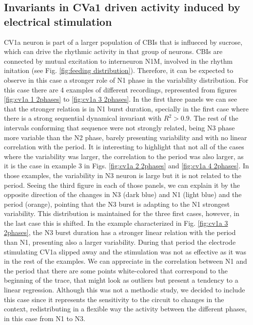 \subsection{Invariants in CVa1 driven activity induced by electrical stimulation}
CV1a neuron is part of a larger population of CBIs that is influeced by sucrose, which can drive the rhythmic activity in that group of neurons. CBIs are connected by mutual excitation to interneuron N1M, involved in the rhythm initation (see Fig. \ref{fig:feeding distribution}). Therefore, it can be expected to observe in this case a stronger role of N1 phase in the variability distribution. For this case there are 4 examples of different recordings, represented from figures \ref{fig:cv1a 1 2phases} to \ref{fig:cv1a 3 2phases}. In the first three panels we can see that the stronger relation is in N1 burst duration, specially in the first case where there is a strong sequential dynamical invariant with $R^2>0.9$. The rest of the intervals conforming that sequence were not strongly related, being N3 phase more variable than the N2 phase, barely presenting variability and with no linear correlation with the period. It is interesting to highlight that not all of the cases where the variability was larger, the correlation to the period was also larger, as it is the case in example 3 in Figs. \ref{fig:cv1a 2 2phases} and \ref{fig:cv1a 4 2phases}. In those examples, the variability in N3 neuron is large but it is not related to the period. Seeing the third figure in each of those panels, we can explain it by the opposite direction of the changes in N3 (dark blue) and N1 (light blue) and the period (orange), pointing that the N3 burst is adapting to the N1 strongest variability. This distribution is maintained for the three first cases, however, in the last case this is shifted. In the example characterized in Fig. \ref{fig:cv1a 3 2phases}, the N3 burst duration has a stronger linear relation with the period than N1, presenting also a larger variability. During that period the electrode stimulating CV1a slipped away and the stimulation was not as effective as it was in the rest of the examples. We can appreciate in the correlation between N1 and the period that there are some points white-colored that correspond to the beginning of the trace, that might look as outliers but present a tendency to a linear regression.  Although this was not a methodic study, we decided to include this case since it represents the sensitivity to the circuit to changes in the context, redistributing in a flexible way the activity between the different phases, in this case from N1 to N3.


